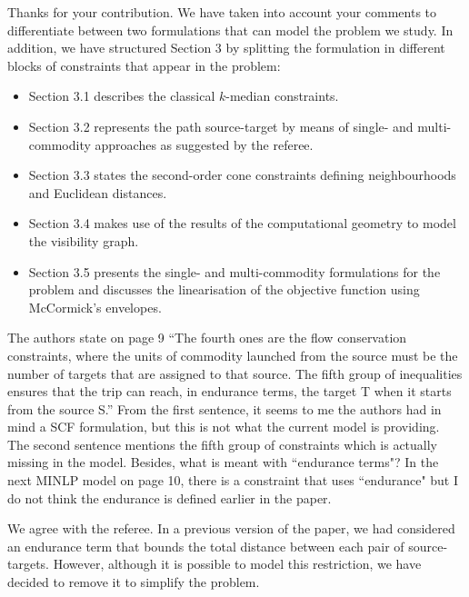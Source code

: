 \documentclass{article}
\newenvironment{reviewer}{\setcounter{pointcounter}{1}}{}
\newcommand{\point}{\text{{\selectfont \thepointcounter} \stepcounter{pointcounter}}}
\begin{document}
\begin{reviewer}
		\begin{tcolorbox}[breakable,enhanced,coltitle=black,colback=green!5!white,colframe=green!75!black,title=\textbf{Answer R2.\point},borderline={1pt}{0pt}{black},boxrule=0pt]
			Thanks for your contribution. We have taken into account your comments to differentiate between two formulations that can model the problem we study. In addition, we have structured Section 3 by splitting the formulation in different blocks of constraints that appear in the problem:
			\begin{itemize}
				\item Section 3.1 describes the classical $k$-median constraints.
				\item Section 3.2 represents the path source-target by means of single- and multi-commodity approaches as suggested by the referee.
				\item Section 3.3 states the second-order cone constraints defining neighbourhoods and Euclidean distances.
				\item Section 3.4 makes use of the results of the computational geometry to model the visibility graph.
				\item Section 3.5 presents the single- and multi-commodity formulations for the problem and discusses the linearisation of the objective function using McCormick's envelopes.
			\end{itemize}
		\end{tcolorbox}
		
		\begin{itshape}
			The authors state on page 9 ``The fourth ones are the flow conservation constraints, where the units of commodity launched from the source must be the number of targets that are assigned to that source. The fifth group of inequalities ensures that the trip can reach, in endurance terms, the target T when it starts from the source S.'' From the first sentence, it seems to me the authors had in mind a SCF formulation, but this is not what the current model is providing. The second sentence mentions the fifth group of constraints which is actually missing in the model. Besides, what is meant with ``endurance terms"? In the next MINLP model on page 10, there is a constraint that uses ``endurance" but I do not think the endurance is defined earlier in the paper.
		\end{itshape}
		
		\begin{tcolorbox}[breakable,enhanced,coltitle=black,colback=green!5!white,colframe=green!75!black,title=\textbf{Answer R2.\point},borderline={1pt}{0pt}{black},boxrule=0pt]
			We agree with the referee. In a previous version of the paper, we had considered an endurance term that bounds the total distance between each pair of source-targets. However, although it is possible to model this restriction, we have decided to remove it to simplify the problem.
		\end{tcolorbox}
		

\end{reviewer}
\end{document}
